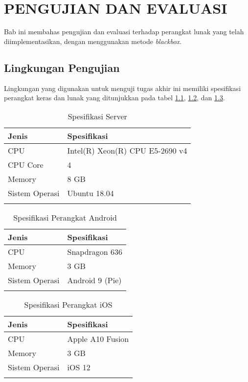 \chapter{PENGUJIAN DAN EVALUASI}
\par Bab ini membahas pengujian dan evaluasi terhadap perangkat lunak yang telah diimplementasikan, dengan menggunakan metode \textit{blackbox}.

\section{Lingkungan Pengujian}
\par Lingkungan yang digunakan untuk menguji tugas akhir ini memiliki spesifikasi perangkat keras dan lunak yang ditunjukkan pada tabel \ref{5:tabel_spesifikasi_server}, \ref{5:tabel_spesifikasi_perangkat_android}, dan \ref{5:tabel_spesifikasi_perangkat_ios}.
\begin{longtable}{|p{2.5cm}|p{6.5cm}|}
    \hline
    \textbf{Jenis} & \textbf{Spesifikasi} \\ \hline
    CPU & Intel(R) Xeon(R) CPU E5-2690 v4 \\ \hline
    CPU Core & 4 \\ \hline
    Memory & 8 GB \\ \hline
    Sistem Operasi & Ubuntu 18.04 \\ \hline
    \caption{Spesifikasi Server}
    \label{5:tabel_spesifikasi_server}
\end{longtable}
\begin{longtable}{|p{2.5cm}|p{6.5cm}|}
    \hline
    \textbf{Jenis} & \textbf{Spesifikasi} \\ \hline
    CPU & Snapdragon 636 \\ \hline
    Memory & 3 GB \\ \hline
    Sistem Operasi & Android 9 (Pie) \\ \hline
    \caption{Spesifikasi Perangkat Android}
    \label{5:tabel_spesifikasi_perangkat_android}
\end{longtable}
\begin{longtable}{|p{2.5cm}|p{6.5cm}|}
    \hline
    \textbf{Jenis} & \textbf{Spesifikasi} \\ \hline
    CPU & Apple A10 Fusion \\ \hline
    Memory & 3 GB \\ \hline
    Sistem Operasi & iOS 12 \\ \hline
    \caption{Spesifikasi Perangkat iOS}
    \label{5:tabel_spesifikasi_perangkat_ios}
\end{longtable}

